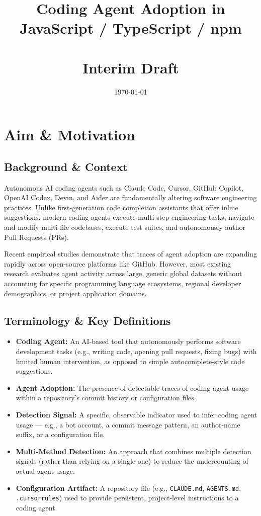 \documentclass[11pt,a4paper]{article}
\title{\textbf{\Large Coding Agent Adoption in JavaScript / TypeScript / npm\\}\\[0.5em]
\Large\textbf{Interim Draft}}
\date{\today}
\begin{document}
\maketitle


\section{Aim \& Motivation}

\subsection{Background \& Context}
Autonomous AI coding agents such as Claude Code, Cursor, GitHub Copilot, OpenAI Codex, Devin, and Aider are fundamentally altering software engineering practices. Unlike first-generation code completion assistants that offer inline suggestions, modern coding agents execute multi-step engineering tasks, navigate and modify multi-file codebases, execute test suites, and autonomously author Pull Requests (PRs).

Recent empirical studies demonstrate that traces of agent adoption are expanding rapidly across open-source platforms like GitHub. However, most existing research evaluates agent activity across large, generic global datasets without accounting for specific programming language ecosystems, regional developer demographics, or project application domains.


\subsection{Terminology \& Key Definitions}

\begin{itemize}
    \item \textbf{Coding Agent:} An AI-based tool that autonomously performs software development tasks (e.g., writing code, opening pull requests, fixing bugs) with limited human intervention, as opposed to simple autocomplete-style code suggestions.
    \item \textbf{Agent Adoption:} The presence of detectable traces of coding agent usage within a repository's commit history or configuration files.
    \item \textbf{Detection Signal:} A specific, observable indicator used to infer coding agent usage --- e.g., a bot account, a commit message pattern, an author-name suffix, or a configuration file.
    \item \textbf{Multi-Method Detection:} An approach that combines multiple detection signals (rather than relying on a single one) to reduce the undercounting of actual agent usage.
    \item \textbf{Configuration Artifact:} A repository file (e.g., \texttt{CLAUDE.md}, \texttt{AGENTS.md}, \texttt{.cursorrules}) used to provide persistent, project-level instructions to a coding agent.
\end{itemize}
\end{document}
